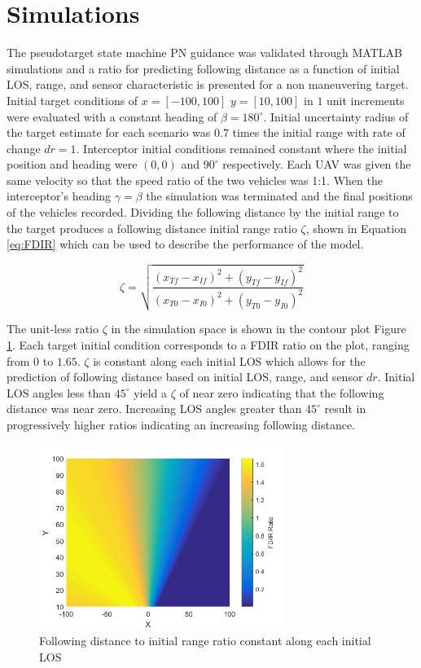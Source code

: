 \documentclass[conference]{IEEEtran}
\begin{document}
\section{Simulations}
The pseudotarget state machine PN guidance was validated through MATLAB simulations and a ratio for predicting following distance as a function of initial LOS, range, and sensor characteristic is presented for a non maneuvering target. Initial target conditions of $x = [-100,100]$ $y = [10,100]$ in $1$ unit increments were evaluated with a constant heading of $\beta = 180^{\circ}$. Initial uncertainty radius of the target estimate for each scenario was $0.7$ times the initial range with rate of change $dr = 1$. Interceptor initial conditions remained constant where the initial position and heading were $(0,0)$ and $90^{\circ}$ respectively. Each UAV was given the same velocity so that the speed ratio of the two vehicles was 1:1. When the interceptor's heading $\gamma = \beta$ the simulation was terminated and the final positions of the vehicles recorded. Dividing the following distance by the initial range to the target produces a following distance initial range ratio $\zeta$, shown in Equation \ref{eq:FDIR} which can be used to describe the performance of the model.


\begin{equation} 
\label{eq:FDIR}
\zeta = \sqrt{\frac{(x_{Tf}-x_{If})^2+(y_{Tf}-y_{If})^2}{(x_{T0}-x_{I0})^2+(y_{T0}-y_{I0})^2}}
\end{equation}

The unit-less ratio $\zeta$ in the simulation space is shown in the contour plot Figure \ref{fig:Rays}. Each target initial condition corresponds to a FDIR ratio on the plot, ranging from $0$ to $1.65$. $\zeta$ is constant along each initial LOS which allows for the prediction of following distance based on initial LOS, range, and sensor $dr$. Initial LOS angles less than $45^{\circ}$ yield a $\zeta$ of near zero indicating that the following distance was near zero. Increasing LOS angles greater than $45^{\circ}$ result in progressively higher ratios indicating an increasing following distance.



\begin{figure}[H]
	\centering
	\includegraphics[width=8cm]{FDIR_Rays.png}
	\caption{Following distance to initial range ratio constant along each initial LOS}
	\label{fig:Rays}
\end{figure}
\end{document}
